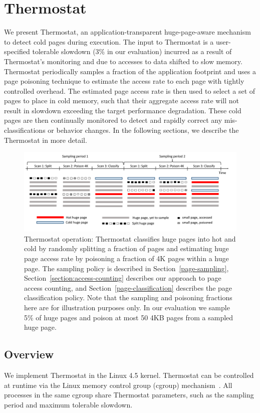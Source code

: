 \section{Thermostat}
\label{proposal}

We present Thermostat, an application-transparent huge-page-aware mechanism to
detect cold pages during execution. The input to Thermostat is a user-specified
tolerable slowdown (3\% in our evaluation) incurred as a result of Thermostat's 
monitoring and due to accesses to data shifted to slow memory. Thermostat periodically
samples a fraction of the application footprint and uses a page poisoning technique
to estimate the access rate to each page with tightly controlled overhead. The
estimated page access rate is then used to select a set of pages to
place in cold memory, such that their aggregate access rate will not result in 
slowdown exceeding the target
performance degradation.  These cold pages are then continually monitored to
detect and rapidly correct any mis-classifications or behavior changes.
In the following sections, we describe the Thermostat in more detail.

\begin{figure}[t]
\centering
\includegraphics[width=1.0\textwidth]{asplos2017/figures/new-policy-sampling-figure.pdf}
\caption{Thermostat operation: Thermostat classifies huge pages into hot and cold by randomly splitting a
fraction of pages and estimating huge page access rate by poisoning a fraction of 4K
pages within a huge page. The sampling policy is described in
Section~\ref{page-sampling}, Section~\ref{section:access-counting} describes our
approach to page access counting, and Section~\ref{page-classification} describes
the page classification policy. Note that the sampling and poisoning fractions here
are for illustration purposes only. In our evaluation we sample 5\% of huge pages
and poison at most 50 4KB pages from a sampled huge page.}
\label{fig:sampling}
\end{figure}

\subsection{Overview}
We implement Thermostat in the Linux 4.5 kernel. Thermostat can be controlled at
runtime via the Linux memory control group (cgroup) mechanism~\cite{cgroups}.
All processes in the same cgroup share Thermostat parameters, such as the
sampling period and maximum tolerable slowdown.

